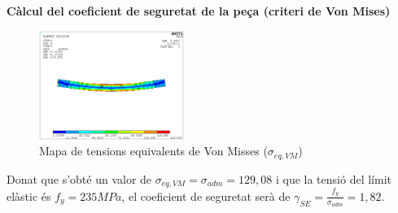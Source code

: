 \documentclass[a4paper]{article}
\def\imgS{0.42\textwidth}
\begin{document}
\textbf{Càlcul del coeficient de seguretat de la peça (criteri de Von Mises)}
\begin{figure}[H]
	\centering
	\includegraphics[width=\imgS]{images/40_von_misses}
	\caption{Mapa de tensions equivalents de Von Misses ($\sigma_{eq,VM}$)}
	\label{fig:40_von_misses}
\end{figure}

Donat que s'obté un valor de $\sigma_{eq,VM} = \sigma_{adm} = 129,08$ i que la tensió del límit elàstic és $f_y = 235 MPa$, el coeficient de seguretat serà de $\gamma_{SE} = \frac{f_y}{\sigma_{adm}} = 1,82$.

\pagebreak
\end{document}
